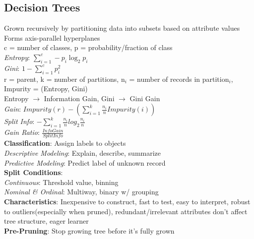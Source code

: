 \documentclass{article}
\begin{document}
\begin{multicols*}{2}
        \subsection*{Decision Trees}
        Grown recursively by partitioning data into subsets based on attribute values\\
        Forms axis-parallel hyperplanes\\
        c = number of classes, p = probability/fraction of class\\
        \textit{Entropy}: $\sum\limits_{i=1}^{c} -p_i \log_2 p_i$\\
        \textit{Gini}: $1 - \sum\limits_{i=1}^{c} p_i^2$\\
        r = parent, k = number of partitions, n$_i$ = number of records in partition$_i$, Impurity
        = (Entropy, Gini)\\
        Entropy $\to$ Information Gain, Gini $\to$ Gini Gain\\
        \textit{Gain}: $Impurity(r) - (\sum\limits_{i=1}^{k} \frac{n_i}{n} Impurity(i))$\\
        \textit{Split Info}: $-\sum\limits_{i=1}^{k} \frac{n_i}{n} log_2 \frac{n_i}{n}$\\
        \textit{Gain Ratio}: $\frac{Info Gain}{Split Info}$\\
        \textbf{Classification}: Assign labels to objects\\
        \textit{Descriptive Modeling}: Explain, describe, summarize\\
        \textit{Predictive Modeling}: Predict label of unknown record\\
        \textbf{Split Conditions}:\\
        \textit{Continuous}: Threshold value, binning\\
        \textit{Nominal \& Ordinal}: Multiway, binary w/ grouping\\
        \textbf{Characteristics}: Inexpensive to construct, fast to test, easy to interpret,
        robust to outliers(especially when pruned), redundant/irrelevant attributes don't affect
        tree structure, eager learner\\
        \textbf{Pre-Pruning}: Stop growing tree before it's fully grown\\

\end{multicols*}
\end{document}
